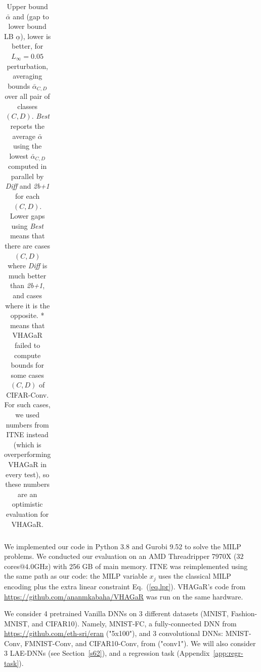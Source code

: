 \begin{table}[b!]
\begin{tabular}{||c c||c c c c c ||c|}
     \end{tabular}
	\caption{Upper bound $\bar{\alpha}$ and (gap to lower bound LB $\underline{\alpha}$), lower is better, for $L_\infty=0.05$ perturbation, averaging bounds $\bar{\alpha}_{C,D}$ over all pair of classes $(C,D)$. {\em Best} reports the average $\bar{\alpha}$ using the lowest $\bar{\alpha}_{C,D}$ computed 
	in parallel by {\em Diff} and {\em 2b+1} for each $(C,D)$. Lower gaps using {\em Best} means that there are cases $(C,D)$ where {\em Diff} is much better than {\em 2b+1}, and cases where it is the opposite. * means that VHAGaR failed to compute bounds for some cases $(C,D)$ of CIFAR-Conv. 
	For such cases, we used numbers from ITNE instead (which is overperforming VHAGaR in every test), so these numbers are an optimistic evaluation for VHAGaR.}
	\vspace{-0.4cm}
    \label{table.classical}
\end{table}


\label{sec.exp}

	We implemented our code in Python 3.8 and Gurobi 9.52 to solve the MILP problems. We conducted our evaluation on an AMD Threadripper 7970X ($32$ cores$@4.0$GHz) with 256 GB of main memory. %
	ITNE \cite{ITNE} was reimplemented using the same path as our code: the MILP variable $x_j$ uses the classical MILP encoding plus the extra linear constraint Eq.~(\ref{eq.lpr}). VHAGaR's code 
	from \url{https://github.com/ananmkabaha/VHAGaR} was run on the same hardware.
	
	We consider 4 pretrained Vanilla DNNs on 3 different datasets (MNIST, Fashion-MNIST, and CIFAR10). Namely,  MNIST-FC, a fully-connected DNN from \url{https://github.com/eth-sri/eran} ("5x100"), and 3 convolutional DNNs: MNIST-Conv, FMNIST-Conv, and CIFAR10-Conv, 
	from \cite{vhagar} ("conv1"). 
	We will also consider 3 LAE-DNNs (see Section~\ref{s62}), and a regression task (Appendix~\ref{app:regr-task}).


